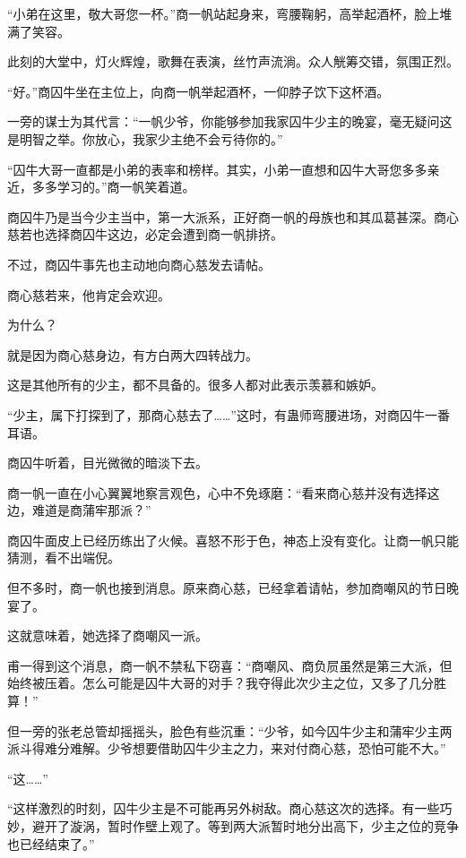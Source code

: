 
\begin{this_body}



“小弟在这里，敬大哥您一杯。”商一帆站起身来，弯腰鞠躬，高举起酒杯，脸上堆满了笑容。

此刻的大堂中，灯火辉煌，歌舞在表演，丝竹声流淌。众人觥筹交错，氛围正烈。

“好。”商囚牛坐在主位上，向商一帆举起酒杯，一仰脖子饮下这杯酒。

一旁的谋士为其代言：“一帆少爷，你能够参加我家囚牛少主的晚宴，毫无疑问这是明智之举。你放心，我家少主绝不会亏待你的。”

“囚牛大哥一直都是小弟的表率和榜样。其实，小弟一直想和囚牛大哥您多多亲近，多多学习的。”商一帆笑着道。

商囚牛乃是当今少主当中，第一大派系，正好商一帆的母族也和其瓜葛甚深。商心慈若也选择商囚牛这边，必定会遭到商一帆排挤。

不过，商囚牛事先也主动地向商心慈发去请帖。

商心慈若来，他肯定会欢迎。

为什么？

就是因为商心慈身边，有方白两大四转战力。

这是其他所有的少主，都不具备的。很多人都对此表示羡慕和嫉妒。

“少主，属下打探到了，那商心慈去了……”这时，有蛊师弯腰进场，对商囚牛一番耳语。

商囚牛听着，目光微微的暗淡下去。

商一帆一直在小心翼翼地察言观色，心中不免琢磨：“看来商心慈并没有选择这边，难道是商蒲牢那派？”

商囚牛面皮上已经历练出了火候。喜怒不形于色，神态上没有变化。让商一帆只能猜测，看不出端倪。

但不多时，商一帆也接到消息。原来商心慈，已经拿着请帖，参加商嘲风的节日晚宴了。

这就意味着，她选择了商嘲风一派。

甫一得到这个消息，商一帆不禁私下窃喜：“商嘲风、商负屃虽然是第三大派，但始终被压着。怎么可能是囚牛大哥的对手？我夺得此次少主之位，又多了几分胜算！”

但一旁的张老总管却摇摇头，脸色有些沉重：“少爷，如今囚牛少主和蒲牢少主两派斗得难分难解。少爷想要借助囚牛少主之力，来对付商心慈，恐怕可能不大。”

“这……”

“这样激烈的时刻，囚牛少主是不可能再另外树敌。商心慈这次的选择。有一些巧妙，避开了漩涡，暂时作壁上观了。等到两大派暂时地分出高下，少主之位的竞争也已经结束了。”


\end{this_body}
